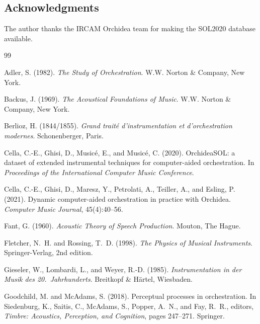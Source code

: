 \documentclass[12pt,a4paper]{article}
\begin{document}
\subsection*{Acknowledgments}
The author thanks the IRCAM Orchidea team for making the SOL2020 database
available.



\begin{thebibliography}{99}

Adler, S. (1982).
\newblock \emph{The Study of Orchestration}.
\newblock W.W. Norton \& Company, New York.

Backus, J. (1969).
\newblock \emph{The Acoustical Foundations of Music}.
\newblock W.W. Norton \& Company, New York.

Berlioz, H. (1844/1855).
\newblock \emph{Grand trait\'e d'instrumentation et d'orchestration modernes}.
\newblock Schonenberger, Paris.

Cella, C.-E., Ghisi, D., Music{\'e}, E., and Music{\'e}, C. (2020).
\newblock OrchideaSOL: a dataset of extended instrumental techniques for
  computer-aided orchestration.
\newblock In \emph{Proceedings of the International Computer Music Conference}.

Cella, C.-E., Ghisi, D., Maresz, Y., Petrolati, A., Teiller, A., and
  Esling, P. (2021).
\newblock Dynamic computer-aided orchestration in practice with {O}rchidea.
\newblock \emph{Computer Music Journal}, 45(4):40--56.

Fant, G. (1960).
\newblock \emph{Acoustic Theory of Speech Production}.
\newblock Mouton, The Hague.

Fletcher, N.~H. and Rossing, T.~D. (1998).
\newblock \emph{The Physics of Musical Instruments}.
\newblock Springer-Verlag, 2nd edition.

Gieseler, W., Lombardi, L., and Weyer, R.-D. (1985).
\newblock \emph{Instrumentation in der Musik des 20.\ Jahrhunderts}.
\newblock Breitkopf \& H{\"a}rtel, Wiesbaden.

Goodchild, M. and McAdams, S. (2018).
\newblock Perceptual processes in orchestration.
\newblock In Siedenburg, K., Saitis, C., McAdams, S., Popper, A.~N., and
  Fay, R.~R., editors, \emph{Timbre: Acoustics, Perception, and Cognition},
  pages 247--271. Springer.


\end{thebibliography}
\end{document}
